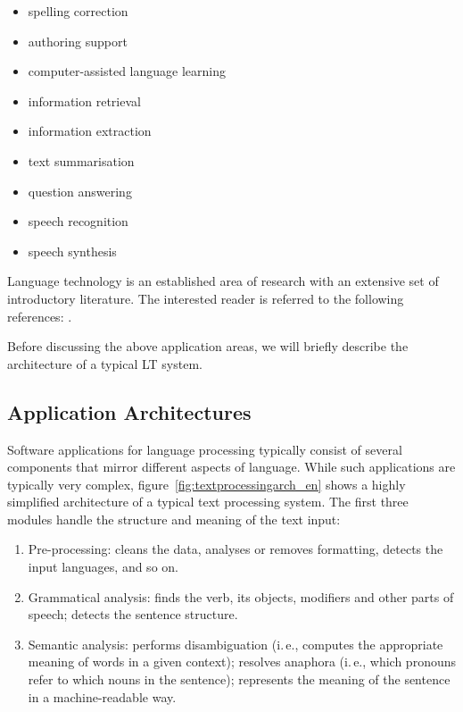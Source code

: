 \begin{multicols}{2}
\begin{itemize}[itemsep=0pt,parsep=0pt]
\item spelling correction
\item authoring support
\item computer-assisted language learning
\item information retrieval 
\item information extraction
\item text summarisation
\item question answering
\item speech recognition 
\item speech synthesis 
\end{itemize}

Language technology is an established area of research with an
extensive set of introductory literature. The interested reader is
referred to the following references: \cite{jurafsky-martin01,
  manning-schuetze1, lt-world1, lt-survey1}.

Before discussing the above application areas, we will briefly describe the architecture of a typical LT system.

\subsection{Application Architectures}

Software applications for language processing typically consist of several components that mirror different aspects of language. While such applications are typically very complex, figure~\ref{fig:textprocessingarch_en} shows a highly simplified architecture of a typical text processing system. The first three modules handle the structure and meaning of the text input:

\begin{enumerate}[itemsep=0pt,parsep=0pt]
\item Pre-processing: cleans the data, analyses or removes formatting, detects the input languages, and so on.
\item Grammatical analysis: finds the verb, its objects, modifiers and other parts of speech; detects the sentence structure.
\item Semantic analysis: performs disambiguation (i.\,e., computes the appropriate meaning of words in a given context); resolves anaphora (i.\,e., which pronouns refer to which nouns in the sentence); represents the meaning of the sentence in a machine-readable way.
\end{enumerate}


\end{multicols}
